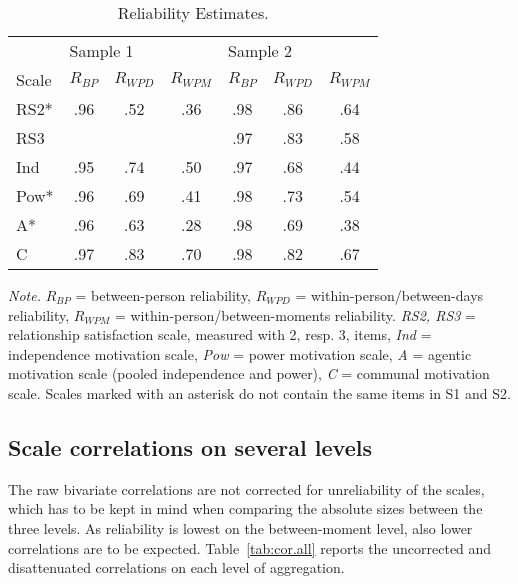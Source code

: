 \documentclass[jou,a4paper,draftfirst]{apa6}\usepackage[]{graphicx}\usepackage[]{color}
\begin{document}
\begin{table*}	
	\begin{threeparttable}
		\caption{Reliability Estimates.}
		\label{tab:reliability}
		\begin{tabular}{lcccccc}
			\toprule			
			
         & \multicolumn{3}{l}{Sample 1} & \multicolumn{3}{l}{Sample 2}\\ 
			 \cmidrule(l{2pt}r{2pt}){2-4} \cmidrule(l{2pt}r{2pt}){5-7}
			 
			  Scale & $R_{BP}$ & $R_{WPD}$ & $R_{WPM}$ & $R_{BP}$ & $R_{WPD}$ & $R_{WPM}$ \\ 
			
			\midrule			   

 RS2* & .96 & .52 & .36 & .98 & .86 & .64 \\ 
  RS3 &  &  &  & .97 & .83 & .58 \\ 
  Ind & .95 & .74 & .50 & .97 & .68 & .44 \\ 
  Pow* & .96 & .69 & .41 & .98 & .73 & .54 \\ 
  A* & .96 & .63 & .28 & .98 & .69 & .38 \\ 
  C & .97 & .83 & .70 & .98 & .82 & .67 \\ 
  
 	
		\midrule
		\end{tabular}
		
		\begin{tablenotes}[para,flushleft]
			{\small
			\textit{Note.} $R_{BP}$ = between-person reliability, $R_{WPD}$ = within-person/between-days reliability, $R_{WPM}$ = within-person/between-moments reliability. \emph{RS2, RS3} = relationship satisfaction scale, measured with 2, resp. 3, items, \emph{Ind} = independence motivation scale, \emph{Pow} = power motivation scale, \emph{A} = agentic motivation scale (pooled independence and power), \emph{C} = communal motivation scale. Scales marked with an asterisk do not contain the same items in S1 and S2.}
	      \end{tablenotes}
	  \end{threeparttable}
\end{table*}			






\subsection{Scale correlations on several levels}

The raw bivariate correlations are not corrected for unreliability of the scales, which has to be kept in mind when comparing the absolute sizes between the three levels. As reliability is lowest on the between-moment level, also lower correlations are to be expected. Table~\ref{tab:cor.all} reports the uncorrected and disattenuated correlations on each level of aggregation.
\end{document}

